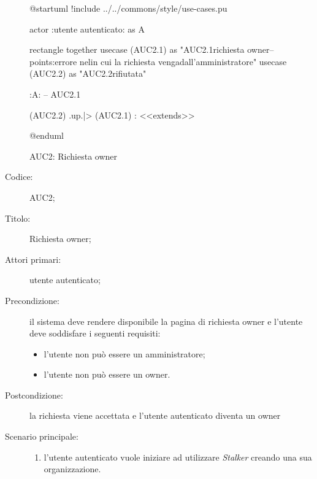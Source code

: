 \documentclass[../../../analisi-dei-requisiti.tex]{subfiles}
\begin{document}
\begin{figure}[H]
  \centering
  \begin{plantuml}
  @startuml
  !include ../../commons/style/use-cases.pu

  actor :utente autenticato: as A

  rectangle {
    together {
      usecase (AUC2.1) as "AUC2.1\nInvio richiesta owner\n--\nExtension points:\nVisualizzazione errore nel\ncaso in cui la richiesta venga\nrifiutata dall'amministratore"
    }
      usecase (AUC2.2) as "AUC2.2\nRichiesta rifiutata"
    }

  :A: -- AUC2.1

  (AUC2.2) .up.|> (AUC2.1) : <<extends>>


  @enduml
  \end{plantuml}
  \caption{AUC2: Richiesta owner}%
  \label{fig:auc2}
\end{figure}

\begin{description}
  \item[Codice:] AUC2;
  \item[Titolo:] Richiesta owner;
  \item[Attori primari:] utente autenticato;
  \item[Precondizione:] il sistema deve rendere disponibile la pagina di richiesta owner e l'utente deve soddisfare i seguenti requisiti:
  \begin{itemize}
    \item l'utente non può essere un amministratore;
    \item l'utente non può essere un owner.
  \end{itemize}
  \item[Postcondizione:] la richiesta viene accettata e l'utente autenticato diventa un owner
  \item[Scenario principale:]
  \begin{enumerate}
    \item l'utente autenticato vuole iniziare ad utilizzare \emph{Stalker} creando una sua organizzazione.
  \end{enumerate}
\end{description}
\end{document}
